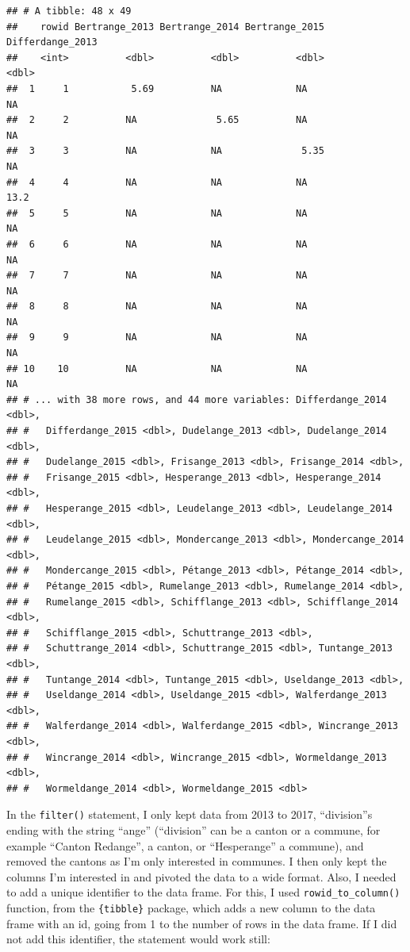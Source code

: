 \documentclass[]{gitbook}
\begin{document}
\begin{verbatim}
## # A tibble: 48 x 49
##    rowid Bertrange_2013 Bertrange_2014 Bertrange_2015 Differdange_2013
##    <int>          <dbl>          <dbl>          <dbl>            <dbl>
##  1     1           5.69          NA             NA                NA  
##  2     2          NA              5.65          NA                NA  
##  3     3          NA             NA              5.35             NA  
##  4     4          NA             NA             NA                13.2
##  5     5          NA             NA             NA                NA  
##  6     6          NA             NA             NA                NA  
##  7     7          NA             NA             NA                NA  
##  8     8          NA             NA             NA                NA  
##  9     9          NA             NA             NA                NA  
## 10    10          NA             NA             NA                NA  
## # ... with 38 more rows, and 44 more variables: Differdange_2014 <dbl>,
## #   Differdange_2015 <dbl>, Dudelange_2013 <dbl>, Dudelange_2014 <dbl>,
## #   Dudelange_2015 <dbl>, Frisange_2013 <dbl>, Frisange_2014 <dbl>,
## #   Frisange_2015 <dbl>, Hesperange_2013 <dbl>, Hesperange_2014 <dbl>,
## #   Hesperange_2015 <dbl>, Leudelange_2013 <dbl>, Leudelange_2014 <dbl>,
## #   Leudelange_2015 <dbl>, Mondercange_2013 <dbl>, Mondercange_2014 <dbl>,
## #   Mondercange_2015 <dbl>, Pétange_2013 <dbl>, Pétange_2014 <dbl>,
## #   Pétange_2015 <dbl>, Rumelange_2013 <dbl>, Rumelange_2014 <dbl>,
## #   Rumelange_2015 <dbl>, Schifflange_2013 <dbl>, Schifflange_2014 <dbl>,
## #   Schifflange_2015 <dbl>, Schuttrange_2013 <dbl>,
## #   Schuttrange_2014 <dbl>, Schuttrange_2015 <dbl>, Tuntange_2013 <dbl>,
## #   Tuntange_2014 <dbl>, Tuntange_2015 <dbl>, Useldange_2013 <dbl>,
## #   Useldange_2014 <dbl>, Useldange_2015 <dbl>, Walferdange_2013 <dbl>,
## #   Walferdange_2014 <dbl>, Walferdange_2015 <dbl>, Wincrange_2013 <dbl>,
## #   Wincrange_2014 <dbl>, Wincrange_2015 <dbl>, Wormeldange_2013 <dbl>,
## #   Wormeldange_2014 <dbl>, Wormeldange_2015 <dbl>
\end{verbatim}

In the \texttt{filter()} statement, I only kept data from 2013 to 2017, ``division''s ending with the string ``ange''
(``division'' can be a canton or a commune, for example ``Canton Redange'', a canton, or ``Hesperange'' a commune),
and removed the cantons as I'm only interested in communes.
I then only kept the columns I'm interested in and pivoted the data to a wide format.
Also, I needed to add a unique identifier to the data frame. For this, I used \texttt{rowid\_to\_column()} function,
from the \texttt{\{tibble\}} package, which adds a new column to the data frame with an id, going from 1 to
the number of rows in the data frame. If I did not add this identifier, the statement would work still:
\end{document}
